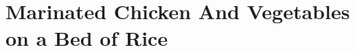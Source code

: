 \thispagestyle{fancy}
\section{Marinated Chicken And Vegetables on a Bed of Rice}
\AddToShipoutPicture*{\MarinatedChickenAndRice}